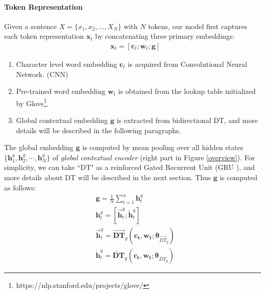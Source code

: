 \documentclass[11pt,a4paper]{article}
\begin{document}
\paragraph{Token Representation}
Given a sentence $X = \{x_1, x_2, ..., X_N\}$ with $N$ tokens,
our model first captures each token representation $\mathbf{x}_t$ by concatenating three primary embeddings: 
\begin{align}
& \mathbf{x}_t = [\mathbf{c}_t; \mathbf{w}_t; \mathbf{g}] \label{token_embedding} 
\end{align}

\begin{enumerate}
\item Character level word embedding $\mathbf{c}_t$ is acquired from Convolutional Neural Network. (CNN) \cite{first_CNN}
\item Pre-trained word embedding $\mathbf{w}_t$ is obtained from the lookup table initialized by Glove\footnote{https://nlp.stanford.edu/projects/glove/}.
\item Global contextual embedding $\mathbf{g}$ is extracted from bidirectional DT, and more details will be described in the following paragraphs.
\end{enumerate}
The global embedding $\mathbf{g}$ is computed by mean pooling over all hidden states $\{\mathbf{h}_1^g, \mathbf{h}_2^g, \cdots, \mathbf{h}_N^g\}$ of \emph{global contextual encoder} (right part in Figure \ref{overview}). For simplicity, we can take ``DT" as a reinforced Gated Recurrent Unit (GRU \citealp{GRU}), and more details about DT will be described in the next section. Thus $\mathbf{g}$ is computed as follows:
\begin{align}
& \mathbf{g} = \frac{1}{N}\sum_{t=1}^n{\mathbf{h}_{t}^g} \\
& \mathbf{h}_{t}^g = [\overrightarrow{\mathbf{h}}_{t}^g; \overleftarrow{\mathbf{h}}_{t}^g] \\
& \overrightarrow{\mathbf{h}}_{t}^g = \overrightarrow{\mathbf{DT}}_{g} (\mathbf{c_t}, \mathbf{w_t}; \mathbf{\theta}_{\overrightarrow{{DT}}_{g}}) \\
& \overleftarrow{\mathbf{h}}_{t}^g = \overleftarrow{\mathbf{DT}}_{g} (\mathbf{c_t}, \mathbf{w_t}; \mathbf{\theta}_{\overleftarrow{{DT}}_{g}})
\end{align}
\end{document}
